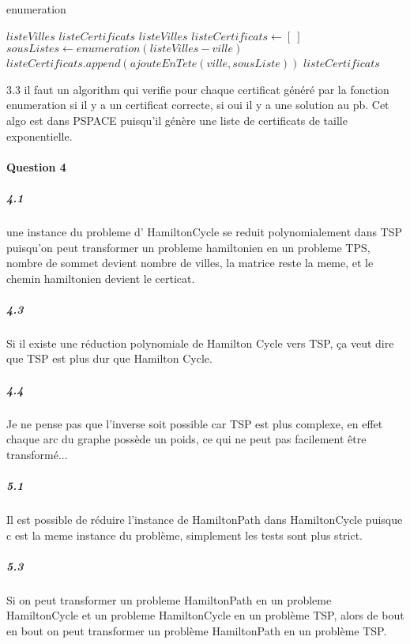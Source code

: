\documentclass[a4paper,10pt]{article}
\begin{document}
\begin{algorithm}
\caption{enumeration}
\begin{algorithmic}
\REQUIRE $listeVilles$
\ENSURE $listeCertificats$
  \RETURN $listeVilles$
\ENDIF
\STATE $listeCertificats \leftarrow [~]$
  \STATE $sousListes \leftarrow enumeration(listeVilles - ville)$
    \STATE $listeCertificats.append(ajouteEnTete(ville,sousListe)) $
  \ENDFOR
\ENDFOR
\RETURN $listeCertificats$
\end{algorithmic}
\end{algorithm}

3.3 il faut un algorithm qui verifie pour chaque certificat généré par la fonction enumeration si il y a un
certificat correcte, si oui il y a une solution au pb. Cet algo est dans PSPACE puisqu'il génère une liste de certificats de taille exponentielle.

\paragraph{Question 4}
\subparagraph{4.1}
une instance du probleme d' HamiltonCycle se reduit polynomialement dans TSP puisqu'on peut transformer un probleme hamiltonien en un probleme TPS,
nombre de sommet devient nombre de villes, la matrice reste la meme, et le chemin hamiltonien devient le certicat.

\subparagraph{4.3}
Si il existe une réduction polynomiale de Hamilton Cycle vers TSP, ça veut dire que TSP est plus dur que Hamilton Cycle.

\subparagraph{4.4}
Je ne pense pas que l'inverse soit possible car TSP est plus complexe, en effet chaque arc du graphe possède un poids, ce qui ne peut pas facilement 
être transformé... 

\subparagraph{5.1}
Il est possible de réduire l'instance de HamiltonPath dans HamiltonCycle puisque c est la meme instance du problème, simplement les tests sont plus strict.

\subparagraph{5.3}
Si on peut transformer un probleme HamiltonPath en un probleme HamiltonCycle et un probleme HamiltonCycle en un problème TSP, alors de bout en bout on peut 
transformer un problème HamiltonPath en un problème TSP.
\end{document}
